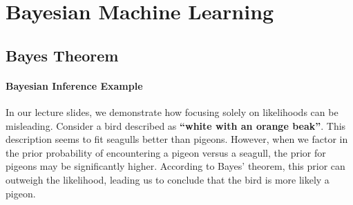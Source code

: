 \chapter{Bayesian Machine Learning}

\section{Bayes Theorem}

\subsubsection{Bayesian Inference Example}

In our lecture slides, we demonstrate how focusing solely on likelihoods can be misleading. Consider a bird described as \textbf{``white with an orange beak''}. This description seems to fit seagulls better than pigeons. However, when we factor in the prior probability of encountering a pigeon versus a seagull, the prior for pigeons may be significantly higher. According to Bayes' theorem, this prior can outweigh the likelihood, leading us to conclude that the bird is more likely a pigeon.

